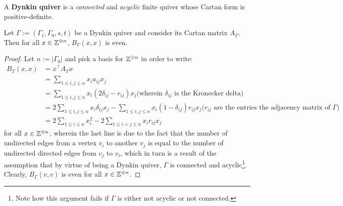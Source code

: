             \begin{definition} \label{def: dynkin_quivers}
                A \textbf{Dynkin quiver} is a \textit{connected} and \textit{acyclic} finite quiver whose Cartan form is positive-definite.
            \end{definition}
            \begin{proposition} \label{prop: evenness_of_cartan_forms_of_dynkin_quivers}
                Let $\Gamma := (\Gamma_1, \Gamma_0, s, t)$ be a Dynkin quiver and consider its Cartan matrix $A_{\Gamma}$. Then for all $x \in \mathbb{Z}^{\oplus n}$, $B_{\Gamma}(x, x)$ is even.  
            \end{proposition}
                \begin{proof}
                    Let $n := |\Gamma_0|$ and pick a basis for $\mathbb{Z}^{\oplus n}$ in order to write:
                        $$
                            \begin{aligned}
                                B_{\Gamma}(x, x) & = x^{\top} A_{\Gamma} x
                                \\
                                & = \sum_{1 \leq i, j \leq n} x_i a_{ij} x_j
                                \\
                                & = \sum_{1 \leq i, j \leq n} x_i (2\delta_{ij} - r_{ij}) x_j \text{(wherein $\delta_{ij}$ is the Kronecker delta)}
                                \\
                                & = 2\sum_{1 \leq i, j \leq n} x_i \delta_{ij} x_j - \sum_{1 \leq i, j \leq n} x_i (1 - \delta_{ij}) r_{ij} x_j \text{($r_{ij}$ are the entries the adjacency matrix of $\Gamma$)}
                                \\
                                & = 2\sum_{1 \leq i \leq n} x_i^2 - 2\sum_{1 \leq i < j \leq n} x_i r_{ij} x_j
                            \end{aligned}
                        $$
                    for all $x \in \mathbb{Z}^{\oplus n}$, wherein the last line is due to the fact that the number of undirected edges from a vertex $v_i$ to another $v_j$ is equal to the number of undirected directed edges from $v_j$ to $v_i$, which in turn is a result of the assumption that by virtue of being a Dynkin quiver, $\Gamma$ is connected and acyclic\footnote{Note how this argument fails if $\Gamma$ is either not acyclic or not connected.}. Clearly, $B_{\Gamma}(v, v)$ is even for all $x \in \mathbb{Z}^{\oplus n}$.
                \end{proof}
